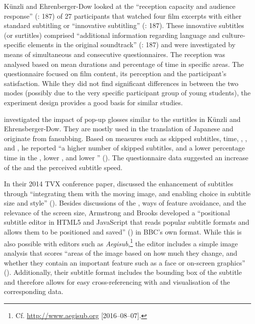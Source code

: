Künzli and Ehrenberger-Dow looked at the “reception capacity and audience response” (\citeyear{Kunzli2011}: 187) of 27 participants that watched four film excerpts with either standard subtitling or “innovative subtitling” (\citeyear{Kunzli2011}: 187). These innovative subtitles (or surtitles) comprised “additional information regarding language and culture-specific elements in the original soundtrack” (\citeyear{Kunzli2011}: 187) and were investigated by means of simultaneous  and consecutive questionnaires. The reception was analysed based on mean  durations and percentage of  time in specific areas. The questionnaire focused on film content, its perception and the participant’s satisfaction. While they did not find significant differences in between the two modes (possibly due to the very specific participant group of young students), the experiment design provides a good basis for similar studies.

\citet{Caffrey2009} investigated the impact of pop-up glosses similar to the surtitles in Künzli and Ehrensberger-Dow. They are mostly used in the translation of Japanese  and originate from fansubbing. Based on  measures such as skipped subtitles,  time, , , and , he reported “a higher number of skipped subtitles, and a lower percentage  time in the , lower , and lower ” (\citealt{Kruger????}). The questionnaire data suggested an increase of the  and the perceived subtitle speed.

In their 2014 TVX conference paper, \citet{Armstrong2014} discussed the enhancement of subtitles through “integrating them with the moving image, and enabling choice in subtitle size and style” (\citeyear{Armstrong2014}). Besides discussions of the , ways of feature avoidance, and the relevance of the screen size, Armstrong and Brooks developed a “positional subtitle editor in HTML5 and JavaScript that reads popular subtitle formats and allows them to be positioned and saved” (\citeyear{Armstrong2014}) in BBC’s own format. While this is also possible with editors such as \textit{Aegisub},\footnote{Cf. \url{http://www.aegisub.org} [2016--08--07].} the editor includes a simple image analysis that scores “areas of the image based on how much they change, and whether they contain an important feature such as a face or on-screen graphics” (\citeyear{Armstrong2014}). Additionally, their subtitle format includes the bounding box of the subtitle and therefore allows for easy cross-referencing with and visualisation of the corresponding  data.

